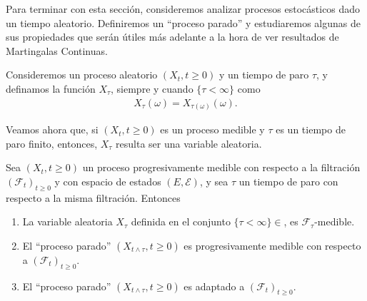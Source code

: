 Para terminar con esta sección, consideremos analizar procesos estocásticos dado un tiempo aleatorio. Definiremos un ``proceso parado'' y estudiaremos algunas de sus propiedades que serán útiles más adelante a la hora de ver resultados de Martingalas Continuas.

\begin{definition}
	Consideremos un proceso aleatorio $(X_t, t \geq 0)$ y un tiempo de paro $\tau$, y definamos la función $X_{\tau}$, siempre y cuando $\{\tau < \infty\}$ como
    \begin{align*}
    X_{\tau}(\omega) = X_{\tau(\omega)}(\omega).
    \end{align*}
\end{definition}
Veamos ahora que, si $(X_t, t \geq 0)$ es un proceso medible y $\tau$ es un tiempo de paro finito, entonces, $X_{\tau}$ resulta ser una variable aleatoria.

\begin{theorem}
	Sea $(X_t, t \geq 0)$ un proceso progresivamente medible con respecto a la filtración $(\mathcal{F}_t)_{t \geq 0}$ y con espacio de estados $(E, \mathcal{E})$, y sea $\tau$ un tiempo de paro con respecto a la misma filtración. Entonces
    \begin{enumerate}
    \item La variable aleatoria $X_{\tau}$ definida en el conjunto $\{\tau < \infty\} \in $, es $\mathcal{F}_{\tau}$-medible.
    \item El ``proceso parado'' $(X_{t \wedge \tau}, t \geq 0)$ es progresivamente medible con respecto a $(\mathcal{F}_t)_{t \geq 0}$.
    \item El ``proceso parado'' $(X_{t \wedge \tau}, t \geq 0)$ es adaptado a $(\mathcal{F}_t)_{t \geq 0}$.
    \end{enumerate}
\end{theorem}

